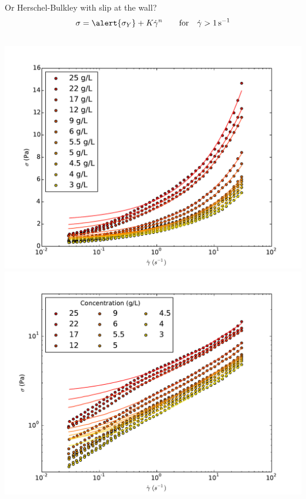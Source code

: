 \documentclass[xcolor=table]{beamer}
\begin{document}
\begin{frame}{Or Herschel-Bulkley with slip at the wall?}
\[ \sigma = \alert{\sigma_Y} + K \dot{\gamma}^n  \qquad\text{for}\quad\dot{\gamma}>\SI{1}{\per\second}\]
\begin{columns}
\includegraphics[width=\textwidth]{HershelBuckley_r1}
\includegraphics[width=\textwidth]{HershelBuckley_slip_loglog_r1}
\end{columns}
\end{frame}
\end{document}
